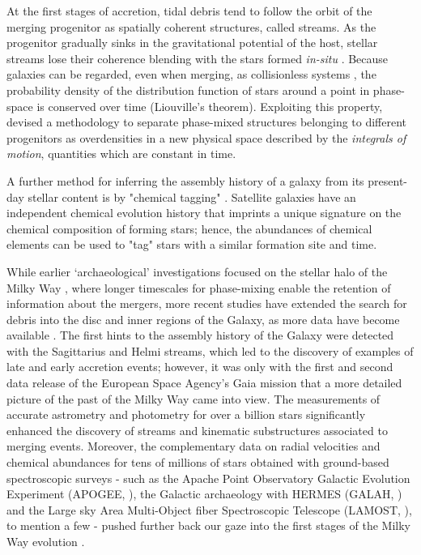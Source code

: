 At the first stages of accretion, tidal debris tend to follow the orbit of the merging progenitor as spatially coherent structures, called streams. As the progenitor gradually sinks in the gravitational potential of the host, stellar streams lose their coherence blending with the stars formed \textit{in-situ} \citep{Knebe2005}. Because galaxies can be regarded, even when merging, as collisionless systems \citep{Binney2008}, the probability density of the distribution function of stars around a point in phase-space is conserved over time (Liouville's theorem).  Exploiting this property, \cite{Helmi1999a} devised a methodology to separate phase-mixed structures belonging to different progenitors as overdensities in a new physical space described by the \textit{integrals of motion}, quantities which are constant in time. 

A further method for inferring the assembly history of a galaxy from its present-day stellar content is by "chemical tagging" \citep{Freeman2002}.  Satellite galaxies have an independent chemical evolution history that imprints a unique signature on the chemical composition of forming stars; hence, the abundances of chemical elements can be used to "tag" stars with a similar formation site and time. 

While earlier `archaeological' investigations focused on the stellar halo of the Milky Way \citep[see reviews of][]{Helmi2020,Deason2024,Bonaca2025}, where longer timescales for phase-mixing enable the retention of information about the mergers, more recent studies have extended the search for debris into the disc and inner regions of the Galaxy,  as more data have become available \citep{Arentsen2020,Kawata2024}. The first hints to the assembly history of the Galaxy were detected with the Sagittarius \citep{Ibata1994} and Helmi \citep{Helmi1999b} streams, which led to the discovery of examples of late and early accretion events; however, it was only with the first and second data release of the European Space Agency's Gaia mission \citep{GaiaCollaboration2016a,GaiaCollaboration2018} that a more detailed picture of the past of the Milky Way came into view. The measurements of accurate astrometry and photometry for over a billion stars significantly enhanced the discovery of streams and kinematic substructures associated to merging events. Moreover, the complementary data on radial velocities and chemical abundances for tens of millions of stars obtained with ground-based spectroscopic surveys - such as the Apache Point Observatory Galactic Evolution Experiment (APOGEE, \citealt{Majewski2017}), the Galactic archaeology with HERMES (GALAH, \citealt{Buder2021}) and the Large sky Area Multi-Object fiber Spectroscopic Telescope (LAMOST, \citealt{Cui2012}), to mention a few - pushed further back our gaze into the first stages of the Milky Way evolution \citep{Kruijssen2019b,Horta2021,Belokurov2022,Malhan2024}. 

